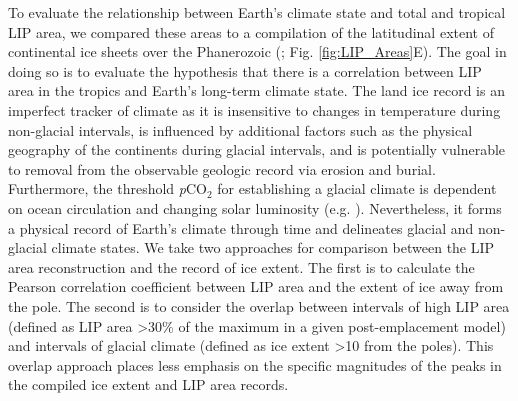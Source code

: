 \documentclass[11pt,letterpaper]{article}
\begin{document}
To evaluate the relationship between Earth's climate state and total and tropical LIP area, we compared these areas to a compilation of the latitudinal extent of continental ice sheets over the Phanerozoic (\citealp{Macdonald2019a}; Fig. \ref{fig:LIP_Areas}E). The goal in doing so is to evaluate the hypothesis that there is a correlation between LIP area in the tropics and Earth's long-term climate state. The land ice record is an imperfect tracker of climate as it is insensitive to changes in temperature during non-glacial intervals, is influenced by additional factors such as the physical geography of the continents during glacial intervals, and is potentially vulnerable to removal from the observable geologic record via erosion and burial. Furthermore, the threshold \textit{p}CO$_2$ for establishing a glacial climate is dependent on ocean circulation and changing solar luminosity (e.g. \citealp{Shevenell2004a, DeConto2008a}). Nevertheless, it forms a physical record of Earth's climate through time and delineates glacial and non-glacial climate states. We take two approaches for comparison between the LIP area reconstruction and the record of ice extent. The first is to calculate the Pearson correlation coefficient between LIP area and the extent of ice away from the pole. The second is to consider the overlap between intervals of high LIP area (defined as LIP area \textgreater30\% of the maximum in a given post-emplacement model) and intervals of glacial climate (defined as ice extent \textgreater10\textdegree\xspace from the poles). This overlap approach places less emphasis on the specific magnitudes of the peaks in the compiled ice extent and LIP area records.
\end{document}
